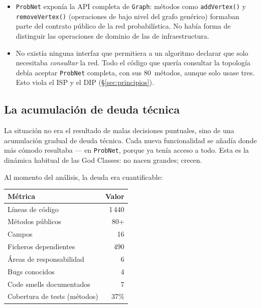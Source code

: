 \documentclass[11pt,a4paper]{article}
\newcommand{\code}[1]{\texttt{#1}}
\begin{document}
\begin{itemize}
  \item \code{ProbNet} exponía la API completa de \code{Graph}: métodos
        como \code{addVertex()} y \code{removeVertex()} (operaciones de
        bajo nivel del grafo genérico) formaban parte del contrato público
        de la red probabilística.  No había forma de distinguir las
        operaciones de dominio de las de infraestructura.

  \item No existía ninguna interfaz que permitiera a un algoritmo declarar
        que solo necesitaba \emph{consultar} la red.  Todo el código que
        quería consultar la topología debía aceptar \code{ProbNet} completa,
        con sus 80~métodos, aunque solo usase tres.  Esto viola el ISP y el
        DIP (§\ref{sec:principios}).
\end{itemize}

\subsection{La acumulación de deuda técnica}

La situación no era el resultado de malas decisiones puntuales, sino de
una acumulación gradual de deuda técnica.  Cada nueva funcionalidad se
añadía donde más cómodo resultaba --- en \code{ProbNet}, porque ya tenía
acceso a todo.  Esta es la dinámica habitual de las God Classes: no nacen
grandes; crecen.

Al momento del análisis, la deuda era cuantificable:

\begin{center}
\begin{tabular}{lr}
\toprule
\textbf{Métrica} & \textbf{Valor} \\
\midrule
Líneas de código                & 1\,440 \\
Métodos públicos                & 80+ \\
Campos                          & 16 \\
Ficheros dependientes           & 490 \\
Áreas de responsabilidad        & 6 \\
Bugs conocidos                  & 4 \\
Code smells documentados        & 7 \\
Cobertura de tests (métodos)    & 37\% \\
\bottomrule
\end{tabular}
\end{center}
\end{document}

